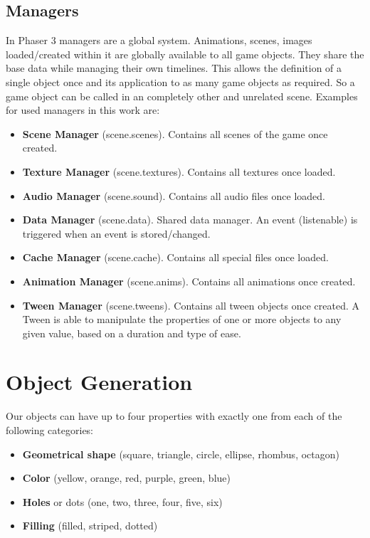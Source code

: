 \subsection{Managers}\label{subsec:managers}
In Phaser 3 managers are a global system.
Animations, scenes, images loaded/created within it are globally available to all game objects.
They share the base data while managing their own timelines.
This allows the definition of a single object once and its application to as many game objects as required.
So a game object can be called in an completely other and unrelated scene.
Examples for used managers in this work are:

\begin{itemize}
    \item \textbf{Scene Manager} (scene.scenes). Contains all scenes of the game once created.
    \item \textbf{Texture Manager} (scene.textures). Contains all textures once loaded.
    \item \textbf{Audio Manager} (scene.sound). Contains all audio files once loaded.
    \item \textbf{Data Manager} (scene.data). Shared data manager.
    An event (listenable) is triggered when an event is stored/changed.
    \item \textbf{Cache Manager} (scene.cache). Contains all special files once loaded.
    \item \textbf{Animation Manager} (scene.anims). Contains all animations once created.
    \item \textbf{Tween Manager} (scene.tweens). Contains all tween objects once created.
    A Tween is able to manipulate the properties of one or more objects to any given value, based
    on a duration and type of ease.
\end{itemize}

\section{Object Generation}\label{sec:object-generation}
Our objects can have up to four properties with exactly one from each of the following categories:

\begin{itemize}
    \item \textbf{Geometrical shape} (square, triangle, circle, ellipse, rhombus, octagon)
    \item \textbf{Color} (yellow, orange, red, purple, green, blue)
    \item \textbf{Holes} or dots (one, two, three, four, five, six)
    \item \textbf{Filling} (filled, striped, dotted)
\end{itemize}

